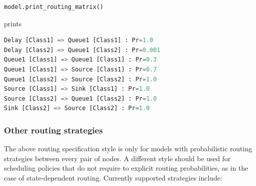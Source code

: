 \begin{PYTHON}
\begin{lstlisting}[language = python]
model.print_routing_matrix()
\end{lstlisting}
prints
\begin{lstlisting}[language = python]
Delay [Class1] => Queue1 [Class1] : Pr=1.0
Delay [Class2] => Queue1 [Class2] : Pr=0.001
Queue1 [Class1] => Queue1 [Class1] : Pr=0.3
Queue1 [Class1] => Source [Class1] : Pr=0.7
Queue1 [Class2] => Source [Class2] : Pr=1.0
Source [Class1] => Sink [Class1] : Pr=1.0
Source [Class2] => Queue1 [Class2] : Pr=1.0
Sink [Class2] => Source [Class2] : Pr=1.0
\end{lstlisting}
\end{PYTHON}

\subsubsection{Other routing strategies}
The above routing specification style is only for models with probabilistic routing strategies between every pair of nodes. A different style should be used for scheduling policies that do not require to explicit routing probabilities, as in the case of state-dependent routing. Currently supported strategies include:
